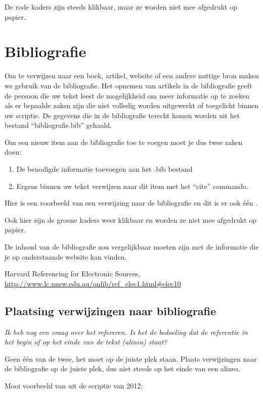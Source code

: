 De rode kaders zijn steeds klikbaar, maar ze worden niet mee afgedrukt op papier.

\section{Bibliografie}

Om te verwijzen naar een boek, artikel, website of een andere nuttige bron maken we gebruik van de bibliografie.
Het opnemen van artikels in de bibliografie geeft de persoon die uw tekst leest de mogelijkheid om meer informatie op te zoeken als er bepaalde zaken zijn die niet volledig worden uitgewerkt of toegelicht binnen uw scriptie.
De gegevens die in de bibliografie terecht komen worden uit het bestand ``bibliografie.bib'' gehaald. 

Om een nieuw item aan de bibliografie toe te voegen moet je dus twee zaken doen:

\begin{enumerate}
 \item De benodigde informatie toevoegen aan het .bib bestand
 \item Ergens binnen uw tekst verwijzen naar dit item met het ``cite'' commando.
\end{enumerate}

Hier is een voorbeeld van een verwijzing naar de bibliografie \cite{GridCast2} en dit is er ook \'e\'en \cite{gridrm}.

Ook hier zijn de groene kaders weer klikbaar en worden ze niet mee afgedrukt op papier.

De inhoud van de bibliografie zou vergelijkbaar moeten zijn met de informatie die je op onderstaande website kan vinden.

Harvard Referencing for Electronic Sources, \url{http://www.lc.unsw.edu.au/onlib/ref_elec1.html#elec10}

\subsection{Plaatsing verwijzingen naar bibliografie}

\textit{Ik heb nog een vraag over het refereren. Is het de bedoeling dat de referentie in het begin of op het einde van de tekst (alinea) staat?}

Geen \'e\'en van de twee, het moet op de juiste plek staan.
Plaats verwijzingen naar de bibliografie op de juiste plek, dus niet steeds op het einde van een alinea.

Mooi voorbeeld van uit de scriptie van 2012:


